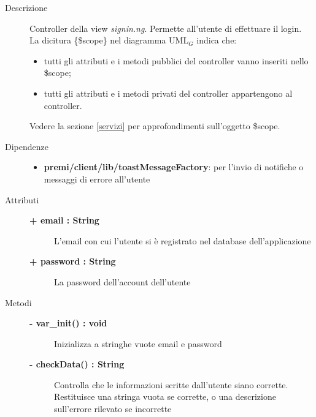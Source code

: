 \begin{description}
\item[Descrizione] \hfill
	Controller della view \textit{signin.ng}. Permette all'utente di effettuare il login.
	\\ La dicitura \{\$scope\} nel diagramma UML$_G$ indica che:
\begin{itemize}
\item tutti gli attributi e i metodi pubblici del controller vanno inseriti nello \$scope;
\item tutti gli attributi e i metodi privati del controller appartengono al controller.
\end{itemize}
Vedere la sezione \ref{servizi} per approfondimenti sull'oggetto \$scope.
	
	
	
\item[Dipendenze] \hfill
	\begin{itemize}
		\item \textbf{premi/client/lib/toastMessageFactory}: per l'invio di notifiche o messaggi di errore all'utente
	\end{itemize}
	
	
\item[Attributi] \hfill
	\begin{description}
		\item[\textbf{+ email : String			}] \hfill
			L'email con cui l'utente si è registrato nel database dell'applicazione
		\item[\textbf{+ password : String			}] \hfill
			La password dell'account dell'utente
	\end{description}
	
	
\item[Metodi] \hfill

	\begin{description}
		\item[\textbf{\color{blue}- var\_init() : void			}] \hfill
			Inizializza a stringhe vuote email e password
	\end{description}
	
	\begin{description}
		\item[\textbf{\color{blue}- checkData() : String			}] \hfill
			Controlla che le informazioni scritte dall'utente siano corrette. Restituisce una stringa vuota se corrette, o una descrizione sull'errore rilevato se incorrette
	\end{description}
	

\end{description}
